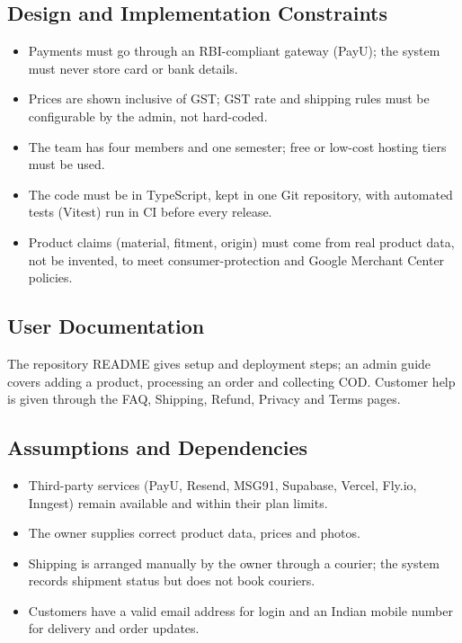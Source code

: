 \documentclass[11pt,a4paper]{article}
\begin{document}
\subsection{Design and Implementation Constraints}
\begin{itemize}
  \item Payments must go through an RBI-compliant gateway (PayU); the system must never
        store card or bank details.
  \item Prices are shown inclusive of GST; GST rate and shipping rules must be
        configurable by the admin, not hard-coded.
  \item The team has four members and one semester; free or low-cost hosting tiers must
        be used.
  \item The code must be in TypeScript, kept in one Git repository, with automated tests
        (Vitest) run in CI before every release.
  \item Product claims (material, fitment, origin) must come from real product data, not
        be invented, to meet consumer-protection and Google Merchant Center policies.
\end{itemize}

\subsection{User Documentation}
The repository README gives setup and deployment steps; an admin guide covers adding a
product, processing an order and collecting COD. Customer help is given through the
FAQ, Shipping, Refund, Privacy and Terms pages.

\subsection{Assumptions and Dependencies}
\begin{itemize}
  \item Third-party services (PayU, Resend, MSG91, Supabase, Vercel, Fly.io, Inngest)
        remain available and within their plan limits.
  \item The owner supplies correct product data, prices and photos.
  \item Shipping is arranged manually by the owner through a courier; the system records
        shipment status but does not book couriers.
  \item Customers have a valid email address for login and an Indian mobile number for
        delivery and order updates.
\end{itemize}
\end{document}
